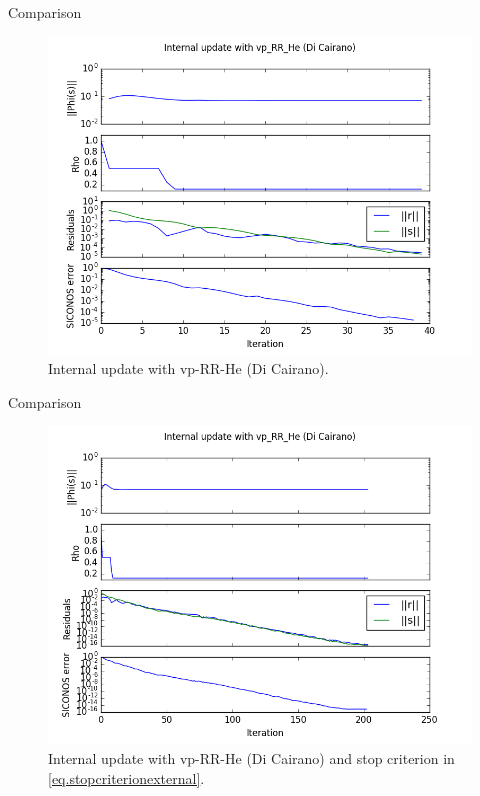 \documentclass[8pt,red]{beamer}
\theoremstyle{plain}
\theoremstyle{definition}
\theoremstyle{remark}
\newcommand{\bi}[1]{\ensuremath{\boldsymbol{#1}}}
\begin{document}
\begin{frame}{Comparison}
\begin{figure}[hbtp]
\centering
\includegraphics[scale=0.4]{Results/S_update/Internal13.png}
\caption{Internal update with vp-RR-He (Di Cairano).}
\end{figure}
\end{frame}

\begin{frame}{Comparison}
\begin{figure}[hbtp]
\centering
\includegraphics[scale=0.4]{Results/S_update/Internal13outsidestop.png}
\caption{Internal update with vp-RR-He (Di Cairano) and stop criterion in \eqref{eq.stopcriterionexternal}.}
\end{figure}
\end{frame}
\end{document}
